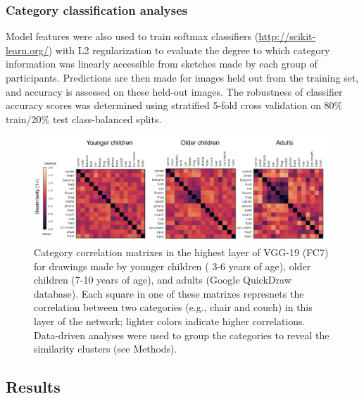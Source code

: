 \documentclass[10pt, letterpaper]{article}
\newenvironment{CodeChunk}{}{}
\begin{document}
\subsubsection{Category classification
analyses}\label{category-classification-analyses}

Model features were also used to train softmax classifiers
(\url{http://scikit-learn.org/}) with L2 regularization to evaluate the
degree to which category information was linearly accessible from
sketches made by each group of participants. Predictions are then made
for images held out from the training set, and accuracy is assessed on
these held-out images. The robustness of classifier accuracy scores was
determined using stratified 5-fold cross validation on 80\% train/20\%
test class-balanced splits.

\begin{CodeChunk}
\begin{figure}[h]

{\centering \includegraphics{figs/RSAAllCat-1} 

}

\caption[Category correlation matrixes in the highest layer of VGG-19 (FC7) for drawings made by younger children ( 3-6 years of age), older children (7-10 years of age), and adults (Google QuickDraw database)]{Category correlation matrixes in the highest layer of VGG-19 (FC7) for drawings made by younger children ( 3-6 years of age), older children (7-10 years of age), and adults (Google QuickDraw database). Each square in one of these matrixes represnets the correlation between two categories (e.g., chair and couch) in this layer of the network; lighter colors indicate higher correlations. Data-driven analyses were used to group the categories to reveal the similarity clusters (see Methods).}\label{fig:RSAAllCat}
\end{figure}
\end{CodeChunk}

\subsection{Results}\label{results-1}
\end{document}
